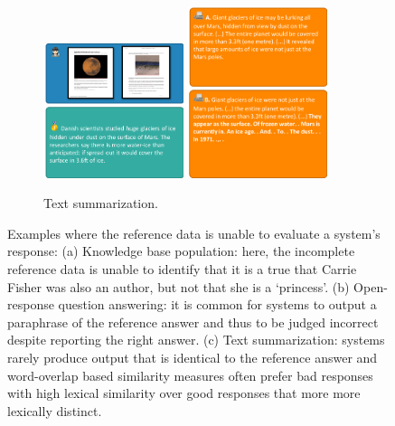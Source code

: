 \begin{figure}
  \hfill
  \begin{subfigure}[t]{0.95\textwidth}
    \includegraphics[width=0.45\textwidth]{figures/err-summ1}
    \hfill
    \includegraphics[width=0.45\textwidth]{figures/err-summ2}
    \caption{\label{fig:intro:example-summarization} Text summarization. }
  \end{subfigure}
  \hfill

  \caption[Examples highlighting the limitations of incomplete evaluation sets]{\label{fig:intro:examples} Examples where the reference data is unable to evaluate a system's response:
  (a) Knowledge base population: here, the incomplete reference data is unable to identify that it is a true that Carrie Fisher was also an author, but not that she is a `princess'.
  (b) Open-response question answering: it is common for systems to output a paraphrase of the reference answer and thus to be judged incorrect despite reporting the right answer.
  (c) Text summarization: systems rarely produce output that is identical to the reference answer and word-overlap based similarity measures often prefer bad responses with high lexical similarity over good responses that more more lexically distinct.  
  }
\end{figure}

